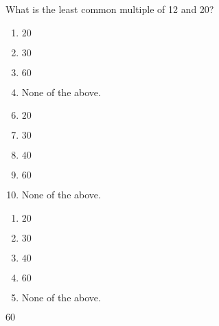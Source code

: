 


  What is the least common multiple of 12 and 20?


\ifsat
	\begin{enumerate}[label=\Alph*)]
		\item  $20$ 
		\item  $30$  
		\item  $60$ %
		\item  None of the above. 
	\end{enumerate}
\else
\fi

\ifacteven
	\begin{enumerate}[label=\textbf{\Alph*.},itemsep=\fill,align=left]
		\setcounter{enumii}{5}
		\item  $20$ 
		\item  $30$  
		\item  $40$  
		\addtocounter{enumii}{1}
		\item  $60$ %
		\item  None of the above. 
	\end{enumerate}
\else
\fi

\ifactodd
	\begin{enumerate}[label=\textbf{\Alph*.},itemsep=\fill,align=left]
		\item  $20$ 
		\item  $30$  
		\item  $40$  
		\item  $60$ %
		\item  None of the above. 
	\end{enumerate}
\else
\fi

\ifgridin
  $60$ %
		
\else
\fi

